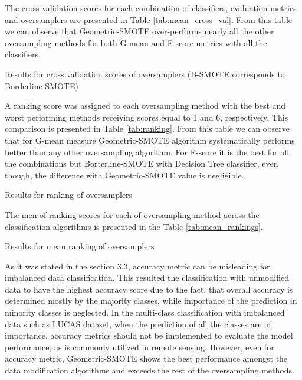 \documentclass[parskip=full]{scrartcl}
\begin{document}
The cross-validation scores for each combination of classifiers, evaluation 
metrics and oversamplers are presented in Table \ref{tab:mean_cross_val}. 
From this table we can observe that Geometric-SMOTE over-performs nearly all 
the other oversampling methods for both G-mean and F-score metrics with all the 
classifiers. 

\begin{table}[H]
	\centering
	\caption{\label{tab:mean_cross_val}Results for cross validation scores 
		of oversamplers (B-SMOTE corresponds to Borderline SMOTE)}
\end{table}

A ranking score was assigned to each oversampling method with the best and 
worst performing methods receiving scores equal to 1 and 6, respectively. This 
comparison is presented in Table \ref{tab:ranking}. From this table we can 
observe that for G-mean measure Geometric-SMOTE algorithm systematically 
performs better than any other oversampling algorithm. For F-score it is the 
best for all the combinations but Borterline-SMOTE with Decision Tree 
classifier, even though, the difference with Geometric-SMOTE value is 
negligible.

\begin{table}[H]
	\centering
	\caption{\label{tab:ranking} Results for ranking of oversamplers}
\end{table}

The men of ranking scores for each of oversampling method across the 
classification algorithms is presented in the Table \ref{tab:mean_rankings}.

\begin{table}[H]
	\centering
	\caption{\label{tab:mean_rankings} Results for mean ranking of oversamplers}
\end{table}

As it was stated in the section 3.3, accuracy metric can be misleading for 
imbalanced data classification. This resulted the classification with 
unmodified data to have the highest accuracy score due to the fact, that 
overall accuracy is determined mostly by the majority classes, while importance 
of the prediction in minority classes is neglected. In the multi-class 
classification with imbalanced data such as LUCAS dataset, when the 
prediction of all the classes are of importance, accuracy metrics should not be 
implemented to evaluate the model performance, as is commonly utilized in 
remote sensing. However, even for accuracy metric, Geometric-SMOTE shows the 
best performance amongst the data modification algorithms and exceeds the rest 
of the oversampling methods.
 
\end{document}

